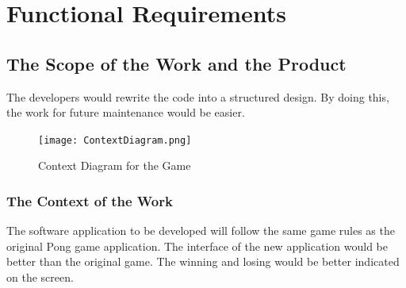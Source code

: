 \documentclass[12pt,letterpaper]{article}
\begin{document}
	\section{Functional Requirements}
	\subsection{The Scope of the Work and the Product}
The developers would rewrite the code into a structured design. By doing this, the work for future maintenance would be easier.
\begin{figure}[h]
  \texttt{[image: ContextDiagram.png]}
  \caption{Context Diagram for the Game}
\end{figure}
	\subsubsection{The Context of the Work}
The software application to be developed will follow the same game rules as the original Pong game application. The interface of the new application would be better than the original game. The winning and losing would be better indicated on the screen.
\end{document}
